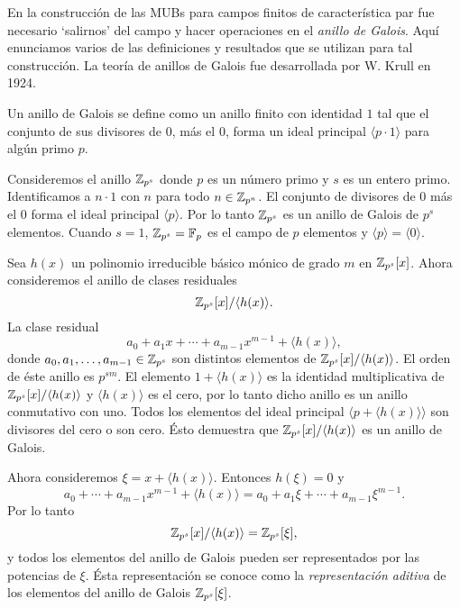 En la construcción de las MUBs para campos finitos de
característica par fue necesario `salirnos' del campo y
hacer operaciones en el \textit{anillo de Galois}. Aquí
enunciamos varios de las definiciones y resultados que se
utilizan para tal construcción. La teoría de anillos de
Galois fue desarrollada por W. Krull en 1924. 
\begin{definition}
  Un anillo de Galois se define como un anillo finito con
  identidad $1$ tal que el conjunto de sus divisores de 0,
  más el 0, forma un ideal principal $\langle p \cdot 1
  \rangle$ para algún primo $p$.
\end{definition}
\begin{example}
  Consideremos el anillo $\operatorname{\mathbb{Z}}_{p^{s}}$ donde $p$ es un número
  primo y $s$ es un entero primo. Identificamos a $n \cdot
  1$ con $n$ para todo $n \in \operatorname{\mathbb{Z}}_{p^{n}}$. El conjunto de
  divisores de 0 más el 0 forma el ideal principal $\langle
  p\rangle$. Por lo tanto $\operatorname{\mathbb{Z}}_{p^{s}}$ es un anillo de
  Galois de $p^{s}$ elementos. Cuando $s = 1$, $\operatorname{\mathbb{Z}}_{p^{s}} =
  \operatorname{\mathbb{F}}_p$ es el campo de $p$ elementos y $\langle p \rangle =
  \langle 0 \rangle$.
\end{example}
\begin{example}
  Sea $h(x)$ un polinomio irreducible básico mónico de grado
  $m$ en $\operatorname{\mathbb{Z}}_{p^{s}}[x]$. Ahora consideremos el anillo de
  clases residuales
  \[
    \operatorname{\mathbb{Z}}_{p^{s}}[x] / \langle h(x) \rangle.
  \] 
  La clase residual
  \[
    a_0 + a_1 x + \cdots + a_{m-1} x ^{m-1} + \langle h(x)
    \rangle,
  \] 
  donde $a_0,a_1,\ldots,a_{m-1} \in \operatorname{\mathbb{Z}}_{p^{s}}$ son
  distintos elementos de $\operatorname{\mathbb{Z}}_{p^{s}}[x] / \langle h(x)
  \rangle$. El orden de éste anillo es $p^{sm}$. El elemento
  $1 + \langle h(x) \rangle$ es la identidad multiplicativa
  de $\operatorname{\mathbb{Z}}_{p^{s}}[x] / \langle h(x) \rangle$ y $\langle h(x)
  \rangle$ es el cero, por lo tanto dicho anillo es un
  anillo conmutativo con uno. Todos los elementos del ideal
  principal $\langle p + \langle h(x) \rangle \rangle$ son
  divisores del cero o son cero. Ésto demuestra que
  $\operatorname{\mathbb{Z}}_{p^{s}}[x] / \langle h(x) \rangle$ es un anillo de
  Galois.

  Ahora consideremos $\xi = x + \langle h(x) \rangle$.
  Entonces $h(\xi) = 0$ y
  \[
    a_0+\cdots+a_{m-1}x^{m-1} + \langle h(x) \rangle
    = a_0+a_1\xi+\cdots+a_{m-1}\xi^{m-1}.
  \] 
  Por lo tanto
  \[
    \operatorname{\mathbb{Z}}_{p^{s}}[x] / \langle h(x) \rangle
    = \operatorname{\mathbb{Z}}_{p^{s}}[\xi],
  \] 
  y todos los elementos del anillo de Galois pueden ser
  representados por las potencias de $\xi$. Ésta
  representación se conoce como la \textit{representación
  aditiva} de los elementos del anillo de Galois
  $\operatorname{\mathbb{Z}}_{p^{s}}[\xi]$.
\end{example}
